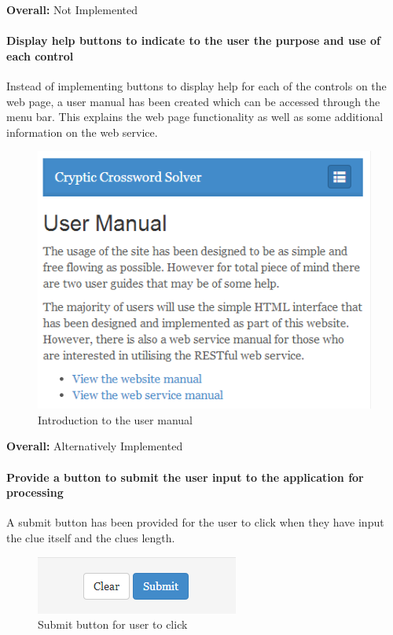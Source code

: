 {\bf Overall:} Not Implemented


\paragraph{Display help buttons to indicate to the user the purpose and use of
each control}

Instead of implementing buttons to display help for each of the controls on the
web page,  a user manual has been created which can be accessed through the menu
bar. This explains  the web page functionality as well as some additional
information on the web service.

\begin{figure}[H]
	\centering
	\includegraphics[keepaspectratio=true]{evidence/manual.png}
	\caption{Introduction to the user manual}
\end{figure}

{\bf Overall:} Alternatively Implemented


\paragraph{Provide a button to submit the user input to the application for
processing}

A submit button has been provided for the user to click when they have input
the clue itself and the clues length.

\begin{figure}[H]
	\centering
	\includegraphics[keepaspectratio=true]{evidence/submit.png}
	\caption{Submit button for user to click}
\end{figure}

